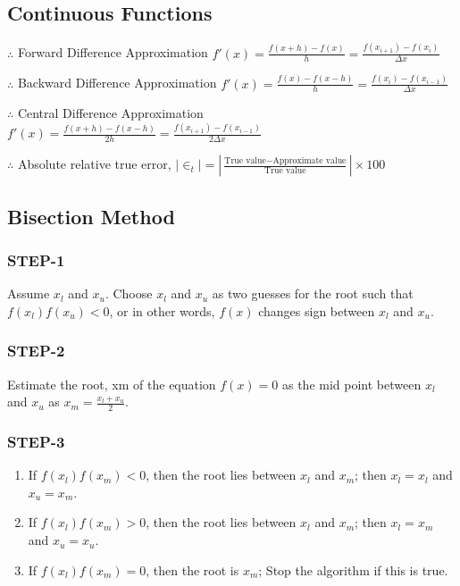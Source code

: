 \subsection*{Continuous Functions}

$\therefore$ {Forward Difference Approximation} \quad
$f'(x) = \frac{f(x+h)-f(x)}{h} = \frac{f(x_{i+1})-f(x_{i})}{\Delta x}$

$\therefore$ {Backward Difference Approximation} \quad
$f'(x) = \frac{f(x)-f(x-h)}{h} = \frac{f(x_i)-f(x_{i-1})}{\Delta x}$

$\therefore$ {Central Difference Approximation} \quad
$f'(x) = \frac{f(x+h)-f(x-h)}{2h} = \frac{f(x_{i+1})-f(x_{i-1})}{2\Delta x}$

$\therefore$ {Absolute relative true error},
$|\in_t| = \left|\frac{\text{True value} - \text{Approximate value}}{\text{True value}}\right| \times 100$

\subsection*{Bisection Method}

\subsubsection*{STEP-1}
Assume $x_l$ and $x_u$.
Choose $x_l$  and $x_u$ as two guesses for the root such that
$f(x_l)f(x_u) < 0$, or in other words, $f(x)$ changes sign
between $x_l$ and $x_u$.

\subsubsection*{STEP-2}
Estimate the root, xm of the equation $f(x) = 0$ as the mid
point between $x_l$ and $x_u$ as $x_m = \frac{x_l+x_u}{2}$.

\subsubsection*{STEP-3}
\begin{enumerate}[parsep=1ex]
   \item If $f(x_l)f(x_m) < 0$, then the root lies between $x_l$ and
   $x_m$; then $x_l = x_l$ and $x_u = x_m$.

   \item If $f(x_l)f(x_m) > 0$, then the root lies between $x_l$ and
   $x_m$; then $x_l = x_m$ and $x_u = x_u$.

   \item If $f(x_l)f(x_m) = 0$, then the root is $x_m$; Stop the
   algorithm if this is true.
\end{enumerate}

